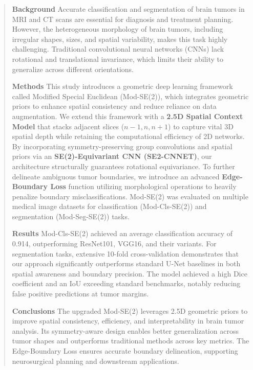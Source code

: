\begin{abstract}
\textbf{Background} Accurate classification and segmentation of brain tumors in MRI and CT scans are essential for diagnosis and treatment planning. However, the heterogeneous morphology of brain tumors, including irregular shapes, sizes, and spatial variability, makes this task highly challenging. Traditional convolutional neural networks (CNNs) lack rotational and translational invariance, which limits their ability to generalize across different orientations.

\textbf{Methods} This study introduces a geometric deep learning framework called Modified Special Euclidean (Mod-SE(2)), which integrates geometric priors to enhance spatial consistency and reduce reliance on data augmentation. We extend this framework with a \textbf{2.5D Spatial Context Model} that stacks adjacent slices ($n-1, n, n+1$) to capture vital 3D spatial depth while retaining the computational efficiency of 2D networks. By incorporating symmetry-preserving group convolutions and spatial priors via an \textbf{SE(2)-Equivariant CNN (SE2-CNNET)}, our architecture structurally guarantees rotational equivariance. To further delineate ambiguous tumor boundaries, we introduce an advanced \textbf{Edge-Boundary Loss} function utilizing morphological operations to heavily penalize boundary misclassifications. Mod-SE(2) was evaluated on multiple medical image datasets for classification (Mod-Cls-SE(2)) and segmentation (Mod-Seg-SE(2)) tasks.

\textbf{Results} Mod-Cls-SE(2) achieved an average classification accuracy of 0.914, outperforming ResNet101, VGG16, and their variants. For segmentation tasks, extensive 10-fold cross-validation demonstrates that our approach significantly outperforms standard U-Net baselines in both spatial awareness and boundary precision. The model achieved a high Dice coefficient and an IoU exceeding standard benchmarks, notably reducing false positive predictions at tumor margins.

\textbf{Conclusions} The upgraded Mod-SE(2) leverages 2.5D geometric priors to improve spatial consistency, efficiency, and interpretability in brain tumor analysis. Its symmetry-aware design enables better generalization across tumor shapes and outperforms traditional methods across key metrics. The Edge-Boundary Loss ensures accurate boundary delineation, supporting neurosurgical planning and downstream applications.
\end{abstract}
